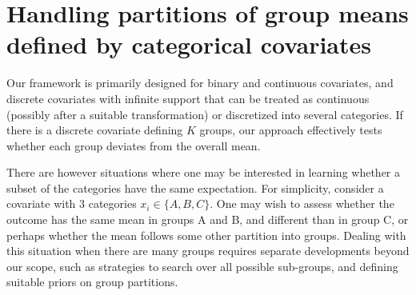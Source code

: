 \section{Handling partitions of group means defined by categorical covariates}

Our framework is primarily designed for binary and continuous covariates, and discrete covariates with infinite support that can be treated as continuous (possibly after a suitable transformation) or discretized into several categories.
If there is a discrete covariate defining $K$ groups, our approach effectively tests whether each group deviates from the overall mean.

There are however situations where one may be interested in learning whether a subset of the categories have the same expectation.
For simplicity, consider a covariate with 3 categories $x_i \in \{A,B,C\}$.
One may wish to assess whether the outcome has the same mean in groups A and B, and different than in group C, or perhaps whether the mean follows some other partition into groups.
Dealing with this situation when there are many groups requires separate developments beyond our scope, such as strategies to search over all possible sub-groups, and defining suitable priors on group partitions.

